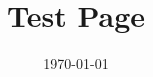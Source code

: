 \documentclass[11pt]{article}
\title{Test Page}
\date{\today}
\begin{document}
\begin{titlepage}
\maketitle
\end{titlepage}
\end{document}
